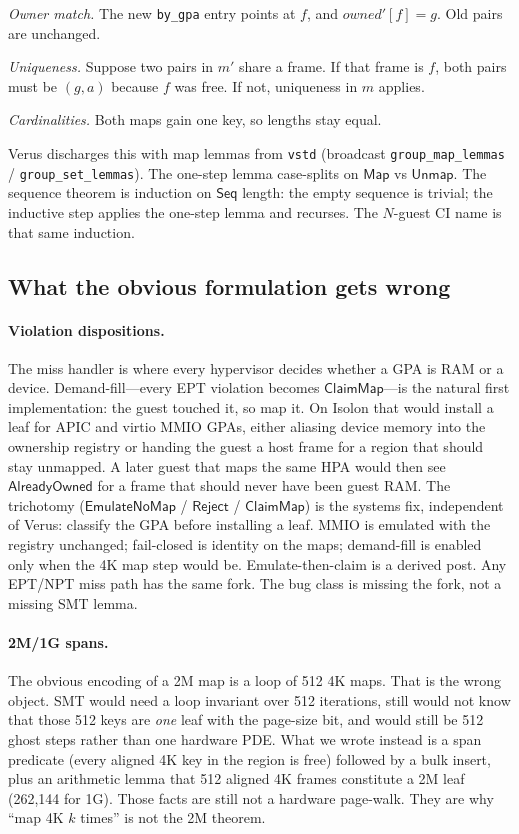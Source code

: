 \documentclass[sigplan,10pt,anonymous]{acmart}
\begin{document}
\emph{Owner match.} The new \texttt{by\_gpa} entry points at $f$, and
$\mathit{owned}'[f]=g$. Old pairs are unchanged.

\emph{Uniqueness.} Suppose two pairs in $m'$ share a frame. If that frame
is $f$, both pairs must be $(g,a)$ because $f$ was free. If not, uniqueness
in $m$ applies.

\emph{Cardinalities.} Both maps gain one key, so lengths stay equal.

Verus discharges this with map lemmas from \texttt{vstd} (broadcast
\texttt{group\_map\_lemmas} / \texttt{group\_set\_lemmas}). The one-step
lemma case-splits on $\mathsf{Map}$ vs $\mathsf{Unmap}$. The sequence
theorem is induction on $\mathsf{Seq}$ length: the empty sequence is
trivial; the inductive step applies the one-step lemma and recurses.
The $N$-guest CI name is that same induction.

\subsection{What the obvious formulation gets wrong}

\paragraph{Violation dispositions.}
The miss handler is where every hypervisor decides whether a GPA is RAM or
a device. Demand-fill---every EPT violation becomes $\mathsf{ClaimMap}$---is
the natural first implementation: the guest touched it, so map it. On Isolon
that would install a leaf for APIC and virtio MMIO GPAs, either aliasing
device memory into the ownership registry or handing the guest a host frame
for a region that should stay unmapped. A later guest that maps the same HPA
would then see $\mathsf{AlreadyOwned}$ for a frame that should never have been
guest RAM. The trichotomy
($\mathsf{EmulateNoMap}$ / $\mathsf{Reject}$ / $\mathsf{ClaimMap}$) is the
systems fix, independent of Verus: classify the GPA before installing a
leaf. MMIO is emulated with the registry unchanged; fail-closed is identity
on the maps; demand-fill is enabled only when the 4K map step would be.
Emulate-then-claim is a derived post. Any EPT/NPT miss path has the same
fork. The bug class is missing the fork, not a missing SMT lemma.

\paragraph{2M/1G spans.}
The obvious encoding of a 2M map is a loop of 512 4K maps. That is the
wrong object. SMT would need a loop invariant over 512 iterations, still
would not know that those 512 keys are \emph{one} leaf with the page-size
bit, and would still be 512 ghost steps rather than one hardware PDE.
What we wrote instead is a span predicate (every aligned 4K key in the
region is free) followed by a bulk insert, plus an arithmetic lemma that
512 aligned 4K frames constitute a 2M leaf (262{,}144 for 1G). Those
facts are still not a hardware page-walk. They are why ``map 4K $k$
times'' is not the 2M theorem.
\end{document}
